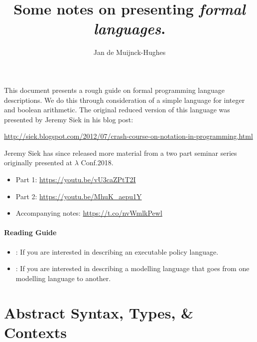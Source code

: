 \documentclass[10pt,a4paper,british,final]{article}
\title{Some notes on presenting \emph{formal languages}.}
\author{Jan de Muijnck-Hughes}
\date{\printdate{2019-01-29}}
\begin{document}
\maketitle{}

This document presents a rough guide on formal programming language descriptions.
We do this through consideration of a simple language for integer and boolean arithmetic.
The original reduced version of this language was presented by Jeremy Siek in his blog post:
\begin{center}
  \url{http://siek.blogspot.com/2012/07/crash-course-on-notation-in-programming.html}
\end{center}

\noindent
Jeremy Siek has since released more material from a two part seminar series originally presented at $\lambda$ Conf.\@ 2018.
  \begin{itemize}
  \item Part 1: \url{https://youtu.be/vU3caZPtT2I}
  \item Part 2: \url{https://youtu.be/MhuK_aepu1Y}
  \item Accompanying notes: \url{https://t.co/nvWmlkPewl}
\end{itemize}

\paragraph{Reading Guide}
\begin{itemize}
\item
  :
  If you are interested in describing an executable policy language.
\item
  :
  If you are interested in describing a modelling language that goes from one modelling language to another.
\end{itemize}

\tableofcontents
\newpage
\section{Abstract Syntax, Types, \& Contexts}\label{sec:defs}
\end{document}
